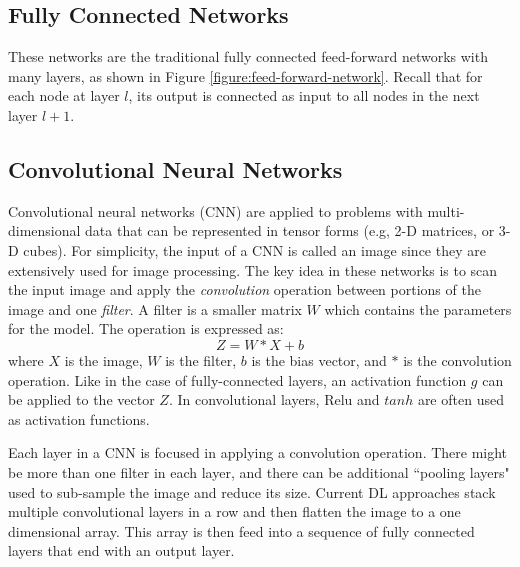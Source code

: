 \documentclass[12pt]{report}
\begin{document}
\subsection{Fully Connected Networks}

These networks are the traditional fully connected feed-forward networks with many layers, as shown in Figure \ref{figure:feed-forward-network}.
Recall that for each node at layer $l$, its output is connected as input to all nodes in the next layer $l+1$.


\subsection{Convolutional Neural Networks}
Convolutional neural networks (\ac{CNN}) are applied to problems with multi-dimensional data that can be represented in tensor forms (e.g, 2-D matrices, or 3-D 
cubes). For simplicity, the input of a \ac{CNN} is called an image since they are extensively used for image processing.  
The key idea in these networks is to scan the input image and apply the {\em convolution} operation between portions of the image and one {\em filter}. 
A filter is a smaller matrix $W$ which contains the parameters for the model. The operation is expressed as: 
\[
Z = W*X + b
\]
where $X$ is the image, $W$ is the filter, $b$ is the bias vector, and $*$ is the convolution operation. Like in the case of fully-connected layers, an activation function $g$ can be applied to  the vector $Z$. In convolutional layers, Relu and $tanh$ are often used as activation functions. 

Each layer in a \ac{CNN} is focused in applying a convolution operation. 
There might be more than one filter in each layer, and there can be additional ``pooling layers" used to sub-sample the image and reduce its size. Current \ac{DL} approaches stack multiple convolutional layers in a row and then flatten the image to a one dimensional array. 
This array is then feed into a sequence 
of fully connected layers that end with an output layer. 
\end{document}
